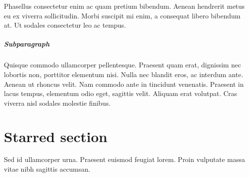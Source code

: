 \documentclass[12pt,a4paper]{book}
\begin{document}
Phasellus consectetur enim ac quam pretium bibendum. Aenean hendrerit metus eu ex viverra
sollicitudin. Morbi suscipit mi enim, a consequat libero bibendum at. Ut sodales
consectetur leo ac tempus.

\subparagraph{Subparagraph}

Quisque commodo ullamcorper pellentesque. Praesent quam erat, dignissim nec lobortis non,
porttitor elementum nisi. Nulla nec blandit eros, ac interdum ante. Aenean ut rhoncus
velit. Nam commodo ante in tincidunt venenatis. Praesent in lacus tempus, elementum odio
eget, sagittis velit. Aliquam erat volutpat. Cras viverra nisl sodales molestie finibus.

\section*{Starred section}

Sed id ullamcorper urna. Praesent euismod feugiat lorem. Proin vulputate massa vitae nibh
sagittis accumsan.
\end{document}
